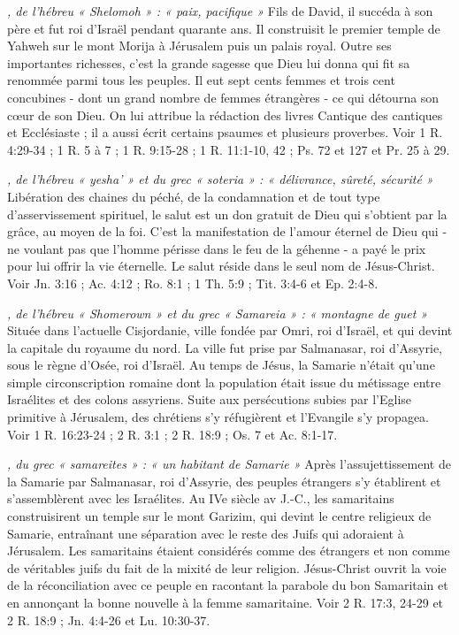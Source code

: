 \begin{multicols}{2}
\textit{, de l'hébreu « Shelomoh » : « paix, pacifique »}\newline
Fils de David, il succéda à son père et fut roi d'Israël pendant quarante ans. Il construisit le premier temple de Yahweh sur le mont Morija à Jérusalem puis un palais royal. Outre ses importantes richesses, c'est la grande sagesse que Dieu lui donna qui fit sa renommée parmi tous les peuples. Il eut sept cents femmes et trois cent concubines - dont un grand nombre de femmes étrangères - ce qui détourna son cœur de son Dieu. On lui attribue la rédaction des livres Cantique des cantiques et Ecclésiaste ; il a aussi écrit certains psaumes et plusieurs proverbes. Voir 1 R. 4:29-34 ; 1 R. 5 à 7 ; 1 R. 9:15-28 ; 1 R. 11:1-10, 42 ; Ps. 72 et 127 et Pr. 25 à 29.

\textit{, de l'hébreu « yesha' » et du grec « soteria » : « délivrance, sûreté, sécurité »}\newline
Libération des chaines du péché, de la condamnation et de tout type d'asservissement spirituel, le salut est un don gratuit de Dieu qui s'obtient par la grâce, au moyen de la foi. C'est la manifestation de l'amour éternel de Dieu qui - ne voulant pas que l'homme périsse dans le feu de la géhenne - a payé le prix pour lui offrir la vie éternelle. Le salut réside dans le seul nom de Jésus-Christ. Voir Jn. 3:16 ; Ac. 4:12 ; Ro. 8:1 ; 1 Th. 5:9 ; Tit. 3:4-6 et Ep. 2:4-8.

\textit{, de l'hébreu « Shomerown » et du grec « Samareia » : « montagne de guet »}\newline
Située dans l'actuelle Cisjordanie, ville fondée par Omri, roi d'Israël, et qui devint la capitale du royaume du nord. La ville fut prise par Salmanasar, roi d'Assyrie, sous le règne d'Osée, roi d'Israël. Au temps de Jésus, la Samarie n'était qu'une simple circonscription romaine dont la population était issue du métissage entre Israélites et des colons assyriens. Suite aux persécutions subies par l'Eglise primitive à Jérusalem, des chrétiens s'y réfugièrent et l'Evangile s'y propagea. Voir 1 R. 16:23-24 ; 2 R. 3:1 ; 2 R. 18:9 ; Os. 7 et Ac. 8:1-17.

\textit{, du grec « samareites » : « un habitant de Samarie »}\newline
Après l'assujettissement de la Samarie par Salmanasar, roi d'Assyrie, des peuples étrangers s'y établirent et s'assemblèrent avec les Israélites. Au IVe siècle av J.-C., les samaritains construisirent un temple sur le mont Garizim, qui devint le centre religieux de Samarie, entraînant une séparation avec le reste des Juifs qui adoraient à Jérusalem. Les samaritains étaient considérés comme des étrangers et non comme de véritables juifs du fait de la mixité de leur religion. Jésus-Christ ouvrit la voie de la réconciliation avec ce peuple en racontant la parabole du bon Samaritain et en annonçant la bonne nouvelle à la femme samaritaine. Voir 2 R. 17:3, 24-29 et 2 R. 18:9 ; Jn. 4:4-26 et Lu. 10:30-37.


\end{multicols}
